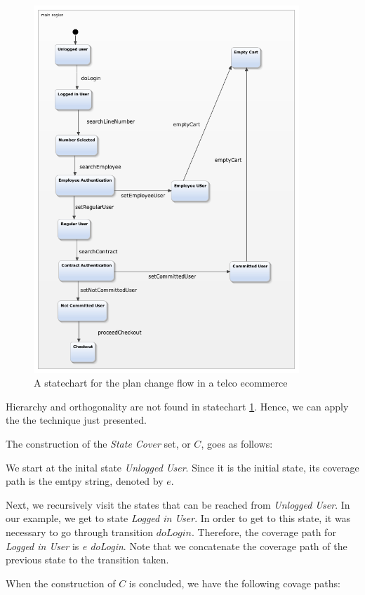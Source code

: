 \begin{figure}[htb]
\centering
\includegraphics[width=10cm]{figuras/trocaPlano}
\caption{\label{fig:trocaPlano} A statechart for the plan change flow in a telco ecommerce}
\end{figure}

Hierarchy and orthogonality are not found in statechart \ref{fig:trocaPlano}. Hence, we can apply the the technique just presented.

The construction of the \textit{State Cover} set, or $C$, goes as follows:

We start at the inital state \textit{Unlogged User}. Since it is the initial state, its coverage path is the emtpy string, denoted by $e$.

Next, we recursively visit the states that can be reached from \textit{Unlogged User}. In our example, we get to state \textit{Logged in User}. In order to get to this state, it was necessary to go through transition $doLogin$. Therefore, the coverage path for \textit{Logged in User} is \textit{e doLogin}. Note that we concatenate the coverage path of the previous state to the transition taken.

When the construction of $C$ is concluded, we have the following covage paths:

